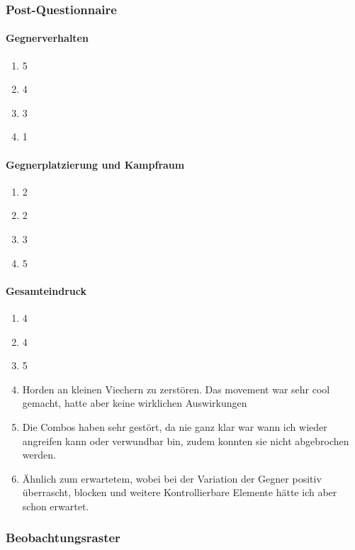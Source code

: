 \documentclass[../Main.tex]{subfiles}
\begin{document}
\subsubsection{Post-Questionnaire}

\paragraph{Gegnerverhalten}
\begin{enumerate}[label=\textbf{Q\arabic*}, leftmargin=1.5cm, itemsep=0.5em]
\item 5
\item 4
\item 3
\item 1
\end{enumerate}

\paragraph{Gegnerplatzierung und Kampfraum}
\begin{enumerate}[label=\textbf{Q\arabic*}, leftmargin=1.5cm, itemsep=0.5em, resume]
\item 2
\item 2
\item 3
\item 5
\end{enumerate}

\paragraph{Gesamteindruck}
\begin{enumerate}[label=\textbf{Q\arabic*}, leftmargin=1.5cm, itemsep=0.5em, resume]
\item 4
\item 4
\item 5
\item Horden an kleinen Viechern zu zerstören. Das movement war sehr cool gemacht, hatte aber keine wirklichen Auswirkungen
\item Die Combos haben sehr gestört, da nie ganz klar war wann ich wieder angreifen kann oder verwundbar bin, zudem konnten sie nicht abgebrochen werden.
\item Ähnlich zum erwartetem, wobei bei der Variation der Gegner positiv überrascht, blocken und weitere Kontrollierbare Elemente hätte ich aber schon erwartet.
\end{enumerate}

\subsubsection{Beobachtungsraster}
\end{document}
